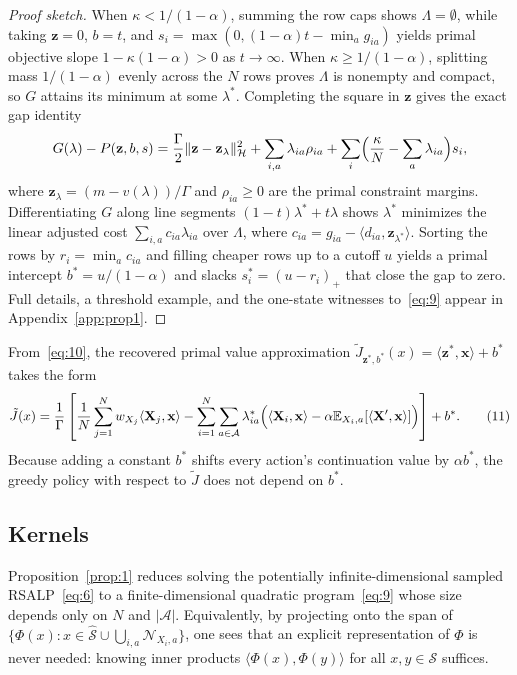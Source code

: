 \documentclass[11pt,letterpaper]{article}
\newcommand{\E}{\mathbb{E}}
\newcommand{\ip}[2]{\langle #1, #2\rangle}
\newcommand{\norm}[1]{\lVert #1\rVert}
\theoremstyle{definition}
\begin{document}
\begin{proof}[Proof sketch]
When $\kappa < 1/(1-\alpha)$, summing the row caps shows $\Lambda=\emptyset$, while taking $\mathbf{z}=0$, $b=t$, and $s_i = \max(0,(1-\alpha)t - \min_a g_{ia})$ yields primal objective slope $1 - \kappa(1-\alpha) > 0$ as $t\to\infty$. When $\kappa \ge 1/(1-\alpha)$, splitting mass $1/(1-\alpha)$ evenly across the $N$ rows proves $\Lambda$ is nonempty and compact, so $G$ attains its minimum at some $\lambda^*$. Completing the square in $\mathbf{z}$ gives the exact gap identity
\[
 G(\lambda) - P(\mathbf{z},b,s)
 = \frac{\Gamma}{2}\norm{\mathbf{z} - \mathbf{z}_\lambda}_{\mathcal{H}}^2
 + \sum_{i,a} \lambda_{ia}\rho_{ia}
 + \sum_i \Bigl(\frac{\kappa}{N} - \sum_a \lambda_{ia}\Bigr)s_i,
\]
where $\mathbf{z}_\lambda = (m - v(\lambda))/\Gamma$ and $\rho_{ia} \ge 0$ are the primal constraint margins. Differentiating $G$ along line segments $(1-t)\lambda^* + t\lambda$ shows $\lambda^*$ minimizes the linear adjusted cost $\sum_{i,a} c_{ia}\lambda_{ia}$ over $\Lambda$, where $c_{ia} = g_{ia} - \ip{d_{ia}}{\mathbf{z}_{\lambda^*}}$. Sorting the rows by $r_i = \min_a c_{ia}$ and filling cheaper rows up to a cutoff $u$ yields a primal intercept $b^* = u/(1-\alpha)$ and slacks $s_i^* = (u-r_i)_+$ that close the gap to zero. Full details, a threshold example, and the one-state witnesses to~\eqref{eq:9} appear in Appendix~\ref{app:prop1}.
\end{proof}

From~\eqref{eq:10}, the recovered primal value approximation $\tilde{J}_{\mathbf{z}^*,b^*}(x) = \ip{\mathbf{z}^*}{\mathbf{x}} + b^*$ takes the form
\begin{equation}
 \tilde{J}(x) = \frac{1}{\Gamma}\left[\frac{1}{N}\sum_{j=1}^N w_{X_j}\ip{\mathbf{X}_j}{\mathbf{x}} - \sum_{i=1}^N\sum_{a\in\mathcal{A}} \lambda^*_{ia}\Bigl(\ip{\mathbf{X}_i}{\mathbf{x}} - \alpha\E_{X_i,a}[\ip{\mathbf{X}'}{\mathbf{x}}]\Bigr)\right] + b^*.
 \tag{11}\label{eq:11}
\end{equation}
Because adding a constant $b^*$ shifts every action's continuation value by $\alpha b^*$, the greedy policy with respect to $\tilde{J}$ does not depend on $b^*$.

\subsection{Kernels}
\label{sec:kernels}

Proposition~\ref{prop:1} reduces solving the potentially infinite-dimensional sampled RSALP~\eqref{eq:6} to a finite-dimensional quadratic program~\eqref{eq:9} whose size depends only on $N$ and $|\mathcal{A}|$. Equivalently, by projecting onto the span of $\{\Phi(x) : x\in\widehat{\mathcal{S}} \cup \bigcup_{i,a}\mathcal{N}_{X_i,a}\}$, one sees that an explicit representation of $\Phi$ is never needed: knowing inner products $\ip{\Phi(x)}{\Phi(y)}$ for all $x,y\in\mathcal{S}$ suffices.
\end{document}
